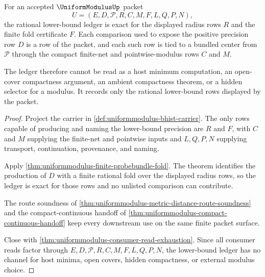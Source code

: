 \begin{theorem}
\label{thm:uniform-modulus-rational-lower-bound-ledger}
For an accepted $\UniformModulusUp$ packet
$$
U=(E,D,\mathcal{P},R,C,M,F,L,Q,P,N),
$$
the rational lower-bound ledger is exact for the displayed radius rows $R$ and the finite fold certificate $F$. Each comparison used to expose the positive precision row $D$ is a row of the packet, and each such row is tied to a bundled center from $\mathcal{P}$ through the compact finite-net and pointwise-modulus rows $C$ and $M$.

The ledger therefore cannot be read as a host minimum computation, an open-cover compactness argument, an ambient compactness theorem, or a hidden selector for a modulus. It records only the rational lower-bound rows displayed by the packet.
\end{theorem}
\begin{proof}
Project the carrier in \autoref{def:uniformmodulus-bhist-carrier}. The only rows capable of producing and naming the lower-bound precision are $R$ and $F$, with $C$ and $M$ supplying the finite-net and pointwise inputs and $L,Q,P,N$ supplying transport, continuation, provenance, and naming.

Apply \autoref{thm:uniformmodulus-finite-probebundle-fold}. The theorem identifies the production of $D$ with a finite rational fold over the displayed radius rows, so the ledger is exact for those rows and no unlisted comparison can contribute.

The route soundness of \autoref{thm:uniformmodulus-metric-distance-route-soundness} and the compact-continuous handoff of \autoref{thm:uniformmodulus-compact-continuous-handoff} keep every downstream use on the same finite packet surface.

Close with \autoref{thm:uniformmodulus-consumer-read-exhaustion}. Since all consumer reads factor through $E,D,\mathcal{P},R,C,M,F,L,Q,P,N$, the lower-bound ledger has no channel for host minima, open covers, hidden compactness, or external modulus choice.
\end{proof}

